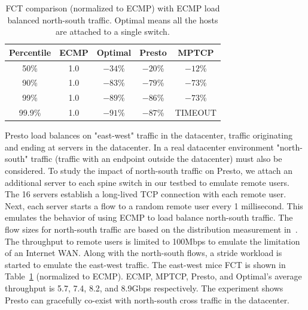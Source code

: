\begin{table}[!htb]
\begin{center}
\begin{tabular}{ |c|c|c|c|c| }
 \hline

 Percentile & ECMP & Optimal & Presto & MPTCP \\
 \hline
 50\%       & 1.0 & $-34$\%     & $-20$\%   & $-12$\% \\
 90\%       & 1.0 & $-83$\%     & $-79$\%   & $-73$\% \\
 99\%       & 1.0 & $-89$\%     & $-86$\%   & $-73$\% \\
 99.9\%     & 1.0 & $-91$\%      & $-87$\%   & TIMEOUT \\

 \hline
\end{tabular}
\caption{FCT comparison (normalized to ECMP) with ECMP load balanced north-south traffic. Optimal means all the hosts are attached to a single  switch.}
	\label{macro_evaluation_north_south_traffic}
\end{center}
\end{table}


Presto load balances on "east-west" traffic in the datacenter, \ie{}traffic
originating and ending at servers in the datacenter. 
In a real datacenter environment "north-south" traffic (\ie{}traffic with an endpoint outside the datacenter)
must also be considered. 
To study the impact of north-south traffic on Presto, we attach an additional server to 
each spine switch in our testbed to emulate remote users. 
The 16 servers establish a long-lived TCP connection with each remote user. 
Next, each server starts a flow to a random remote user every 1 millisecond. This emulates  
the behavior of using ECMP to load balance north-south traffic.
The flow sizes for north-south traffic are based on the distribution measurement in~\cite{he2013next}. 
The throughput to remote users is limited to 100Mbps to emulate the limitation of an Internet WAN. 
Along with the north-south flows, 
a stride workload is started to emulate the east-west traffic. 
The east-west mice FCT is shown in Table~\ref{macro_evaluation_north_south_traffic} (normalized to ECMP). 
ECMP, MPTCP, Presto, and Optimal's average throughput is 
5.7, 7.4, 8.2, and 8.9Gbps respectively. 
The experiment shows Presto can gracefully co-exist with north-south cross traffic
in the datacenter.



